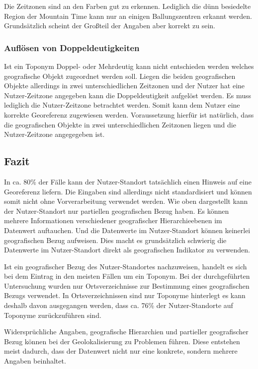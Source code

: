 				 Die Zeitzonen sind an den Farben gut zu erkennen. 
				 Lediglich die dünn besiedelte Region der Mountain Time kann nur an einigen Ballungszentren erkannt werden. 
				 Grundsätzlich scheint der Großteil der Angaben aber korrekt zu sein.

			\subsubsection{Auflösen von Doppeldeutigkeiten}

				Ist ein Toponym Doppel- oder Mehrdeutig kann nicht entschieden werden welches geografische Objekt zugeordnet werden soll.
				Liegen die beiden geografischen Objekte allerdings in zwei unterschiedlichen Zeitzonen und der Nutzer hat eine Nutzer-Zeitzone angegeben kann die Doppeldeutigkeit aufgelöst werden.
				Es muss lediglich die Nutzer-Zeitzone betrachtet werden.
				Somit kann dem Nutzer eine korrekte Georeferenz zugewiesen werden.
				Voraussetzung hierfür ist natürlich, dass die geografischen Objekte in zwei unterschiedlichen Zeitzonen liegen und die Nutzer-Zeitzone angegegeben ist.

		\subsection{Fazit} 

			In ca. 80\% der Fälle kann der Nutzer-Standort tatsächlich einen Hinweis auf eine Georeferenz liefern.
			Die Eingaben sind allerdings nicht standardisiert und können somit nicht ohne Vorverarbeitung verwendet werden.
			Wie oben dargestellt kann der Nutzer-Standort nur partiellen geografischen Bezug haben.
			Es können mehrere Informationen verschiedener geografischer Hierarchieebenen im Datenwert auftauchen. 
			Und die Datenwerte im Nutzer-Standort können keinerlei geografischen Bezug aufweisen.
			Dies macht es grundsätzlich schwierig die Datenwerte im Nutzer-Standort direkt als geografischen Indikator zu verwenden.
			
			Ist ein geografischer Bezug des Nutzer-Standortes nachzuweisen, handelt es sich bei dem Eintrag in den meisten Fällen um ein Toponym.
			Bei der durchgeführten Untersuchung wurden nur Ortsverzeichnisse zur Bestimmung eines geografischen Bezugs verwendet.
			In Ortsverzeichnissen sind nur Toponyme hinterlegt es kann deshalb davon ausgegangen werden, dass ca. 76\% der Nutzer-Standorte auf Toponyme zurückzuführen sind.

			Widersprüchliche Angaben, geografische Hierarchien und partieller geografischer Bezug können bei der Geolokalisierung zu Problemen führen.
			Diese entstehen meist dadurch, dass der Datenwert nicht nur eine konkrete, sondern mehrere Angaben beinhaltet.
			
